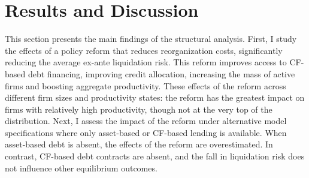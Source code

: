 \documentclass[12pt]{article}
\begin{document}
\section{Results and Discussion \label{sec:results}}

This section presents the main findings of the structural analysis. First, I study the effects of a policy reform that reduces reorganization costs, significantly reducing the average ex-ante liquidation risk. This reform improves access to CF-based debt financing, improving credit allocation, increasing the mass of active firms and boosting aggregate productivity. These effects of the reform across different firm sizes and productivity states: the reform has the greatest impact on firms with relatively high productivity, though not at the very top of the distribution. Next, I assess the impact of the reform under alternative model specifications where only asset-based or CF-based lending is available. When asset-based debt is absent, the effects of the reform are overestimated. In contrast, CF-based debt contracts are absent, and the fall in liquidation risk does not influence other equilibrium outcomes.
\end{document}
